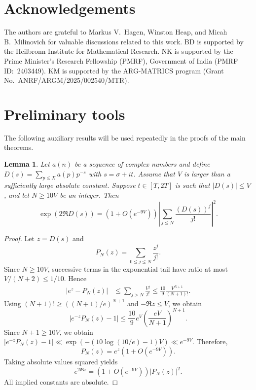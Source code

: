 \documentclass[twoside,reqno,11pt,a4paper]{amsart}
\numberwithin{equation}{section}
\theoremstyle{plain}
\newtheorem{lem}[thm]{Lemma}
\theoremstyle{definition}
\theoremstyle{remark}
\renewcommand{\le}{\leqslant}
\renewcommand{\ge}{\geqslant}
\begin{document}
\section*{Acknowledgements}
		
		The authors are grateful to Markus V.~Hagen, Winston Heap, and Micah B.~Milinovich for valuable discussions related to this work. BD is supported by the Heilbronn Institute for Mathematical Research. NK is supported by the Prime Minister's Research Fellowship (PMRF), Government of India (PMRF ID:~2403449). KM is supported by the ARG-MATRICS program (Grant No.~ANRF/ARGM/2025/002540/MTR).
		
	\section{Preliminary tools}
The following auxiliary results will be used repeatedly in the proofs of the main theorems.
	\begin{lem}\label{truncate-dirichlet-poly}
			Let $a(n)$ be a sequence of complex numbers and define $D(s)= \sum_{p\le  X}a(p)p^{-s}$ with $s=\sigma +it $. Assume that $V$  is larger than a sufficiently large absolute constant. Suppose $t\in [T,2T]$ is such that $|D(s)|\le  V$, and let $N\ge 10V$ be an integer.  Then
			\begin{equation*}
				\exp\left(2\Re D(s)\right) = \left(1+O\left(e^{-9V}\right)\right)\left| \sum_{j\le  N} \frac{(D(s))^j}{j!}\right|^2.
			\end{equation*}
		\end{lem}
	\begin{proof}
		Let $z=D(s)$ and
        \begin{equation*}
                P_N(z)=\sum_{0\le j\le N}\frac{z^j}{j!}.
        \end{equation*}
        Since $N\ge10V$, successive terms in the exponential tail have ratio at most $V/(N+2)\le1/10$.  Hence
        \begin{align*}
        \left|e^z-P_N(z)\right|
        &\le \sum_{j>N}\frac{V^j}{j!}
        \le \frac{10}{9}\frac{V^{N+1}}{(N+1)!}.
        \end{align*}
        Using $(N+1)!\ge((N+1)/e)^{N+1}$ and $-\Re z\le V$, we obtain
        \begin{equation*}
        \left|e^{-z}P_N(z)-1\right|
        \le
        \frac{10}{9}e^V
        \left(\frac{eV}{N+1}\right)^{N+1}.
        \end{equation*}
Since $N+1\ge 10V$, we obtain 
$\left|e^{-z}P_N(z)-1\right|
\ll
\exp\left(-\left(10\log(10/e)-1\right)V\right)
\ll e^{-9V}.$
Therefore, 
\begin{equation*}
    P_N(z)=e^z\left( 1+ O\left(e^{-9V}\right)\right).
\end{equation*}
Taking absolute values squared yields
        \begin{equation*}
                e^{2\Re z}
=\left(1+O(e^{-9V})\right)|P_N(z)|^2.
\end{equation*}
        All implied constants are absolute.
	\end{proof}
\end{document}
